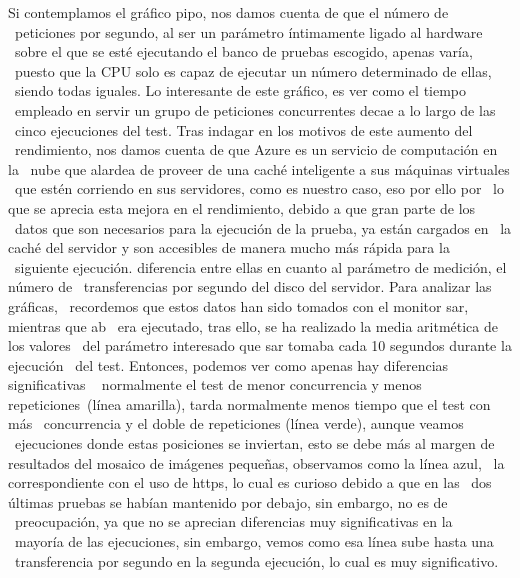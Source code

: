 \documentclass[11pt,twoside,a4paper]{book}
\begin{document}
Si contemplamos el gráfico pipo, nos damos cuenta de que el número de \
peticiones por segundo, al ser un parámetro íntimamente ligado al hardware \
sobre el que se esté ejecutando el banco de pruebas escogido, apenas varía, \
puesto que la CPU solo es capaz de ejecutar un número determinado de ellas, \
siendo todas iguales. Lo interesante de este gráfico, es ver como el tiempo \
empleado en servir un grupo de peticiones concurrentes decae a lo largo de las \
cinco ejecuciones del test. Tras indagar en los motivos de este aumento del \
rendimiento, nos damos cuenta de que Azure es un servicio de computación en la \
nube que alardea de proveer de una caché inteligente a sus máquinas virtuales \
que estén corriendo en sus servidores, como es nuestro caso, eso por ello por \
lo que se aprecia esta mejora en el rendimiento, debido a que gran parte de los \
datos que son necesarios para la ejecución de la prueba, ya están cargados en \
la caché del servidor y son accesibles de manera mucho más rápida para la \
siguiente ejecución. \newline \newline
diferencia entre ellas en cuanto al parámetro de medición, el número de \
transferencias por segundo del disco del servidor. Para analizar las gráficas, \
recordemos que estos datos han sido tomados con el monitor sar, mientras que ab \
era ejecutado, tras ello, se ha realizado la media aritmética de los valores \
del parámetro interesado que sar tomaba cada 10 segundos durante la ejecución \
del test. Entonces, podemos ver como apenas hay diferencias significativas \
normalmente el test de menor concurrencia y menos repeticiones\
(línea amarilla), tarda normalmente menos tiempo que el test con más \
concurrencia y el doble de repeticiones (línea verde), aunque veamos \
ejecuciones donde estas posiciones se inviertan, esto se debe más al margen de \
resultados del mosaico de imágenes pequeñas, observamos como la línea azul, \
la correspondiente con el uso de https, lo cual es curioso debido a que en las \
dos últimas pruebas se habían mantenido por debajo, sin embargo, no es de \
preocupación, ya que no se aprecian diferencias muy significativas en la \
mayoría de las ejecuciones, sin embargo, vemos como esa línea sube hasta una \
transferencia por segundo en la segunda ejecución, lo cual es muy significativo.
\end{document}
